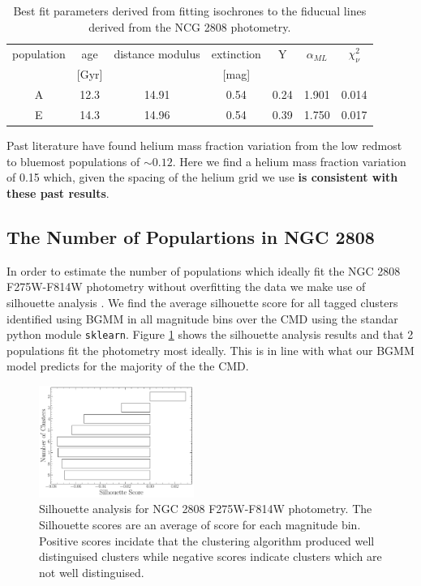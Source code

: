 \begin{table}
  \centering
  \begin{tabular}{c | c c c c c c}
    \hline
    population & age & distance modulus & extinction & Y & $\alpha_{ML}$ & $\chi^{2}_{\nu}$\\
    & [Gyr] & & [mag] & & &\\
    \hline
    \hline
    A & 12.3 & 14.91 & 0.54 & 0.24 & 1.901 & 0.014\\
    E & 14.3 & 14.96 & 0.54 & 0.39 & 1.750 & 0.017 \\
    \hline
  \end{tabular}
  \label{tab:BestFitResults}
  \caption{Best fit parameters derived from fitting isochrones to the fiducual lines derived from the NCG 2808 photometry.}
\end{table}


Past literature \citep[e.g. ][]{Milone2015, Milone2018} have found helium mass fraction variation from the low redmost to bluemost populations of $\sim 0.12$. Here we find a helium mass fraction variation of 0.15 which, given the spacing of the helium grid we use \textbf{is consistent with these past results}.

\subsection{The Number of Populartions in NGC 2808}
In order to estimate the number of populations which ideally fit the NGC 2808
F275W-F814W photometry without overfitting the data we make use of silhouette
analysis \citep[][and in a similar manner to how \citet{Valle2022}
preform their analysis of spectroscopic data]{ROUSSEEUW198753}. We find the average silhouette score for all tagged
clusters identified using BGMM in all magnitude bins over the CMD using the
standar python module \texttt{sklearn}. Figure \ref{fig:clusterAn} shows the
silhouette analysis results and that 2 populations fit the photometry most
ideally. This is in line with what our BGMM model predicts for the majority of
the the CMD.

\begin{figure}
  \centering
  \includegraphics[width=0.45\textwidth]{figures/ngc2808/ClusterAnalysis.pdf}
  \caption{Silhouette analysis for NGC 2808 F275W-F814W photometry. The Silhouette scores
  are an average of score for each magnitude bin. Positive scores incidate that the clustering
  algorithm produced well distinguised clusters while negative scores indicate clusters which are not
  well distinguised.}
  \label{fig:clusterAn}
\end{figure}


